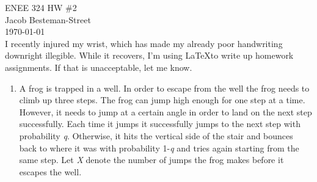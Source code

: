 \documentclass{report}
\begin{document}
ENEE 324 HW \#2 \\
Jacob Besteman-Street \\
\today \\

I recently injured my wrist, which has made my already poor handwriting downright illegible.
While it recovers, I'm using \LaTeX to write up homework assignments. If that is unacceptable, let me know.

\begin{enumerate}
\item A frog is trapped in a well.  In order to escape from the well the frog needs to climb up three steps.
The frog can jump high enough for one step at a time.
However, it needs to jump at a certain angle in order to land on the next step successfully.
Each time it jumps it successfully jumps to the next step with probability \textit{q}.
 Otherwise, it hits the vertical side of the stair and bounces back to where it was
 with probability 1-\textit{q} and tries again starting from the same step.  Let \textit{X}
 denote the number of jumps the frog makes before it escapes the well.


\end{enumerate}
\end{document}
